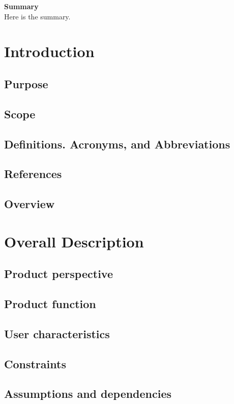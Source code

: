 \documentclass[12pt]{article}
\begin{document}
\newpage
\Large \noindent \textbf{Summary}\\
\normalsize
Here is the summary.

\newpage
\large
\tableofcontents

\section{Introduction}
   
\subsection{Purpose}
\subsection{Scope}
\subsection{Definitions. Acronyms, and Abbreviations}
\subsection{References}
\subsection{Overview}

\section{Overall Description}
\subsection{Product perspective}
\subsection{Product function}
\subsection{User characteristics}
\subsection{Constraints}
\subsection{Assumptions and dependencies}

\newpage
\normalsize
\end{document}
